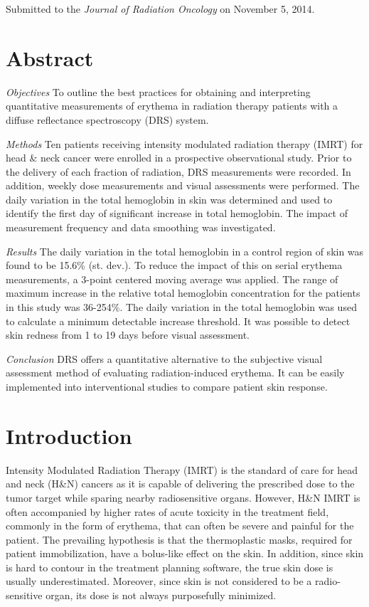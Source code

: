 \noindent Submitted to the \textit{Journal of Radiation Oncology} on November 5, 2014.

\section*{Abstract}
\noindent \emph{Objectives} To outline the best practices for obtaining and interpreting quantitative measurements of erythema in radiation therapy patients with a diffuse reflectance spectroscopy (DRS) system.

\noindent \emph{Methods} Ten patients receiving intensity modulated radiation therapy (IMRT) for head \& neck cancer were enrolled in a prospective observational study. Prior to the delivery of each fraction of radiation, DRS measurements were recorded. In addition, weekly dose measurements and visual assessments were performed. The daily variation in the total hemoglobin in skin was determined and used to identify the first day of significant increase in total hemoglobin. The impact of measurement frequency and data smoothing was investigated.

\noindent \emph{Results} The daily variation in the total hemoglobin in a control region of skin was found to be 15.6\% (st. dev.). To reduce the impact of this on serial erythema measurements, a 3-point centered moving average was applied. The range of maximum increase in the relative total hemoglobin concentration for the patients in this study was 36-254\%. The daily variation in the total hemoglobin was used to calculate a minimum detectable increase threshold. It was possible to detect skin redness from 1 to 19 days before visual assessment.

\noindent \emph{Conclusion} DRS offers a quantitative alternative to the subjective visual assessment method of evaluating radiation-induced erythema. It can be easily implemented into interventional studies to compare patient skin response.

\section{Introduction}
Intensity Modulated Radiation Therapy (IMRT) is the standard of care for head and neck (H\&N) cancers as it is capable of delivering the prescribed dose to the tumor target while sparing nearby radiosensitive organs.\cite{Lee2007} However, H\&N IMRT is often accompanied by higher rates of acute toxicity in the treatment field, commonly in the form of erythema, that can often be severe and painful for the patient.\cite{DeConno1991} The prevailing hypothesis is that the thermoplastic masks, required for patient immobilization, have a bolus-like effect on the skin.\cite{Lee2002} In addition, since skin is hard to contour in the treatment planning software, the true skin dose is usually underestimated.\cite{Court2008} Moreover, since skin is not considered to be a radio-sensitive organ, its dose is not always purposefully minimized.\cite{Saibishkumar2008}

